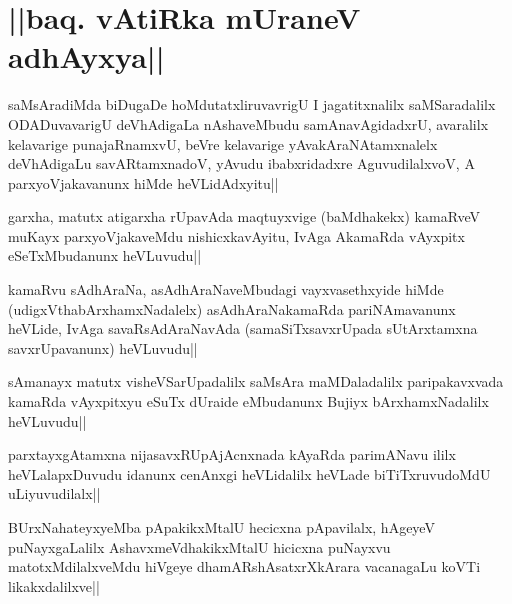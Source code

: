 \section*{||baq. vAtiRka mUraneV adhAyxya||}


\begin{artha}
saMsAradiMda biDugaDe hoMdutatxliruvavrigU I jagatitxnalilx saMSaradalilx ODADuvavarigU deVhAdigaLa nAshaveMbudu samAnavAgidadxrU, avaralilx kelavarige punajaRnamxvU, beVre kelavarige yAvakAraNAtamxnalelx deVhAdigaLu savARtamxnadoV, yAvudu ibabxridadxre AguvudilalxvoV, A parxyoVjakavanunx hiMde heVLidAdxyitu||
\end{artha}


\begin{artha}
garxha, matutx atigarxha rUpavAda maqtuyxvige (baMdhakekx) kamaRveV muKayx parxyoVjakaveMdu nishicxkavAyitu, IvAga AkamaRda vAyxpitx eSeTxMbudanunx heVLuvudu||
\end{artha}

\begin{artha}
kamaRvu sAdhAraNa, asAdhAraNaveMbudagi vayxvasethxyide hiMde (udigxVthabArxhamxNadalelx) asAdhAraNakamaRda pariNAmavanunx heVLide, IvAga savaRsAdAraNavAda (samaSiTxsavxrUpada sUtArxtamxna savxrUpavanunx) heVLuvudu||
\end{artha}


\begin{artha}
sAmanayx matutx visheVSarUpadalilx saMsAra maMDaladalilx paripakavxvada kamaRda vAyxpitxyu eSuTx dUraide eMbudanunx Bujiyx bArxhamxNadalilx heVLuvudu||
\end{artha}

\begin{artha}
parxtayxgAtamxna nijasavxRUpAjAcnxnada kAyaRda parimANavu ililx heVLalapxDuvudu idanunx cenAnxgi heVLidalilx heVLade biTiTxruvudoMdU uLiyuvudilalx||
\end{artha}


\begin{artha}
BUrxNahateyxyeMba pApakikxMtalU hecicxna pApavilalx, hAgeyeV puNayxgaLalilx AshavxmeVdhakikxMtalU hicicxna puNayxvu matotxMdilalxveMdu hiVgeye dhamARshAsatxrXkArara vacanagaLu koVTi likakxdalilxve||
\end{artha}

